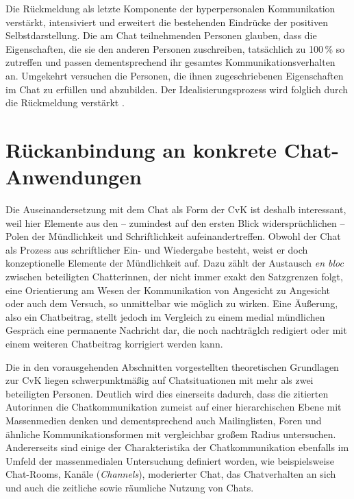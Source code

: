 Die Rückmeldung als letzte Komponente der hyperpersonalen Kommunikation verstärkt, intensiviert und erweitert die bestehenden Eindrücke der positiven Selbstdarstellung. Die am Chat teilnehmenden Personen glauben, dass die Eigenschaften, die sie den anderen Personen zuschreiben, tatsächlich zu 100\,\% so zutreffen und passen dementsprechend ihr gesamtes Kommunikationsverhalten an. Umgekehrt versuchen die Personen, die ihnen zugeschriebenen Eigenschaften im Chat zu erfüllen und abzubilden. Der Idealisierungsprozess wird folglich durch die Rückmeldung verstärkt \citep[5]{walther_effect_2011}.




\section{Rückanbindung an konkrete Chat-Anwendungen}
\label{K2:sec:rueckanbindung}


Die Auseinandersetzung mit dem Chat als Form der CvK ist deshalb interessant, weil hier Elemente aus den -- zumindest auf den ersten Blick widersprüchlichen -- Polen der Mündlichkeit und Schriftlichkeit aufeinandertreffen. Obwohl der Chat als Prozess aus schriftlicher Ein- und Wiedergabe besteht, weist er doch konzeptionelle Elemente der Mündlichkeit auf. Dazu zählt der Austausch \emph{en bloc} zwischen beteiligten Chatter{\textperiodcentered}innen, der nicht immer exakt den Satzgrenzen folgt, eine Orientierung am Wesen der Kommunikation von Angesicht zu Angesicht oder auch dem Versuch, so unmittelbar wie möglich zu wirken. Eine Äußerung, also ein Chatbeitrag, stellt jedoch im Vergleich zu einem medial mündlichen Gespräch eine permanente Nachricht dar, die noch nachträglch redigiert oder mit einem weiteren Chatbeitrag korrigiert werden kann.

Die in den vorausgehenden Abschnitten vorgestellten theoretischen Grundlagen zur CvK liegen schwerpunktmäßig auf Chatsituationen mit mehr als zwei beteiligten Personen. Deutlich wird dies einerseits dadurch, dass die zitierten Autor{\textperiodcentered}innen die Chatkommunikation zumeist auf einer hierarchischen Ebene mit Massenmedien denken und dementsprechend auch Mailinglisten, Foren und ähnliche Kommunikationsformen mit vergleichbar großem Radius untersuchen. Andererseits sind einige der Charakteristika der Chatkommunikation ebenfalls im Umfeld der massenmedialen Untersuchung definiert worden, wie beispielsweise Chat-Rooms, Kanäle (\emph{Channels}), moderierter Chat, das Chatverhalten an sich und auch die zeitliche sowie räumliche Nutzung von Chats.

